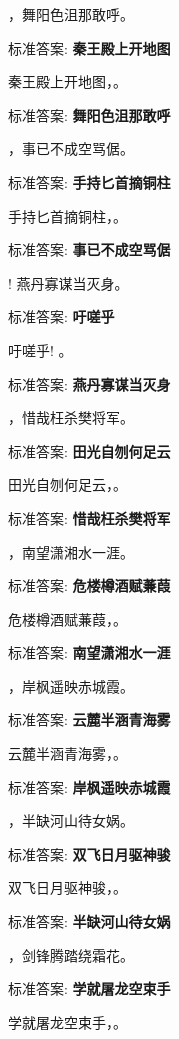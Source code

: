 \documentclass[12pt, a4paper, addpoints]{exam}
\begin{document}
\begin{questions}
\question[1] \uline{\qquad\qquad\qquad}，舞阳色沮那敢呼。

标准答案: \textbf{秦王殿上开地图}

\question[1] 秦王殿上开地图，\uline{\qquad\qquad\qquad}。

标准答案: \textbf{舞阳色沮那敢呼}

\question[1] \uline{\qquad\qquad\qquad}，事已不成空骂倨。

标准答案: \textbf{手持匕首摘铜柱}

\question[1] 手持匕首摘铜柱，\uline{\qquad\qquad\qquad}。

标准答案: \textbf{事已不成空骂倨}

\question[1] \uline{\qquad\qquad\qquad}! 燕丹寡谋当灭身。

标准答案: \textbf{吁嗟乎}

\question[1] 吁嗟乎! \uline{\qquad\qquad\qquad}。

标准答案: \textbf{燕丹寡谋当灭身}

\question[1] \uline{\qquad\qquad\qquad}，惜哉枉杀樊将军。

标准答案: \textbf{田光自刎何足云}

\question[1] 田光自刎何足云，\uline{\qquad\qquad\qquad}。

标准答案: \textbf{惜哉枉杀樊将军}

\question[1] \uline{\qquad\qquad\qquad}，南望潇湘水一涯。

标准答案: \textbf{危楼樽酒赋蒹葭}

\question[1] 危楼樽酒赋蒹葭，\uline{\qquad\qquad\qquad}。

标准答案: \textbf{南望潇湘水一涯}

\question[1] \uline{\qquad\qquad\qquad}，岸枫遥映赤城霞。

标准答案: \textbf{云麓半涵青海雾}

\question[1] 云麓半涵青海雾，\uline{\qquad\qquad\qquad}。

标准答案: \textbf{岸枫遥映赤城霞}

\question[1] \uline{\qquad\qquad\qquad}，半缺河山待女娲。

标准答案: \textbf{双飞日月驱神骏}

\question[1] 双飞日月驱神骏，\uline{\qquad\qquad\qquad}。

标准答案: \textbf{半缺河山待女娲}

\question[1] \uline{\qquad\qquad\qquad}，剑锋腾踏绕霜花。

标准答案: \textbf{学就屠龙空束手}

\question[1] 学就屠龙空束手，\uline{\qquad\qquad\qquad}。


\end{questions}
\end{document}

